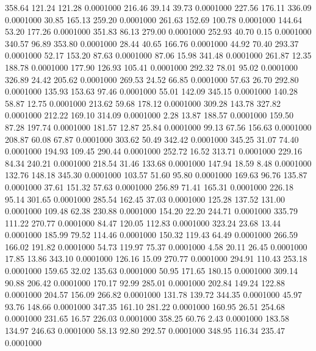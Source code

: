  358.64  121.24  121.28   0.0001000
 216.46   39.14   39.73   0.0001000
 227.56  176.11  336.09   0.0001000
  30.85  165.13  259.20   0.0001000
 261.63  152.69  100.78   0.0001000
 144.64   53.20  177.26   0.0001000
 351.83   86.13  279.00   0.0001000
 252.93   40.70    0.15   0.0001000
 340.57   96.89  353.80   0.0001000
  28.44   40.65  166.76   0.0001000
  44.92   70.40  293.37   0.0001000
  52.17  153.20   87.63   0.0001000
  87.06   15.98  341.48   0.0001000
 261.87   12.35  188.78   0.0001000
 177.90  126.93  105.41   0.0001000
 292.32   78.01   95.02   0.0001000
 326.89   24.42  205.62   0.0001000
 269.53   24.52   66.85   0.0001000
  57.63   26.70  292.80   0.0001000
 135.93  153.63   97.46   0.0001000
  55.01  142.09  345.15   0.0001000
 140.28   58.87   12.75   0.0001000
 213.62   59.68  178.12   0.0001000
 309.28  143.78  327.82   0.0001000
 212.22  169.10  314.09   0.0001000
   2.28   13.87  188.57   0.0001000
 159.50   87.28  197.74   0.0001000
 181.57   12.87   25.84   0.0001000
  99.13   67.56  156.63   0.0001000
 208.87   60.08   67.87   0.0001000
 303.62   50.49  342.42   0.0001000
 345.25   31.07   74.40   0.0001000
 194.93  109.45  290.44   0.0001000
 252.72   16.52  313.71   0.0001000
 229.16   84.34  240.21   0.0001000
 218.54   31.46  133.68   0.0001000
 147.94   18.59    8.48   0.0001000
 132.76  148.18  345.30   0.0001000
 103.57   51.60   95.80   0.0001000
 169.63   96.76  135.87   0.0001000
  37.61  151.32   57.63   0.0001000
 256.89   71.41  165.31   0.0001000
 226.18   95.14  301.65   0.0001000
 285.54  162.45   37.03   0.0001000
 125.28  137.52  131.00   0.0001000
 109.48   62.38  230.88   0.0001000
 154.20   22.20  244.71   0.0001000
 335.79  111.22  270.77   0.0001000
  84.47  120.05  112.83   0.0001000
 323.24   23.68   13.44   0.0001000
 185.99   79.52  114.46   0.0001000
 150.32  119.43   64.49   0.0001000
 266.59  166.02  191.82   0.0001000
  54.73  119.97   75.37   0.0001000
   4.58   20.11   26.45   0.0001000
  17.85   13.86  343.10   0.0001000
 126.16   15.09  270.77   0.0001000
 294.91  110.43  253.18   0.0001000
 159.65   32.02  135.63   0.0001000
  50.95  171.65  180.15   0.0001000
 309.14   90.88  206.42   0.0001000
 170.17   92.99  285.01   0.0001000
 202.84  149.24  122.88   0.0001000
 204.57  156.09  266.82   0.0001000
 131.78  139.72  344.35   0.0001000
  45.97   93.76  148.66   0.0001000
 347.35  161.10  281.22   0.0001000
 160.95   26.51  254.68   0.0001000
 231.65   16.57  226.03   0.0001000
 358.25   60.76    2.43   0.0001000
 183.58  134.97  246.63   0.0001000
  58.13   92.80  292.57   0.0001000
 348.95  116.34  235.47   0.0001000
